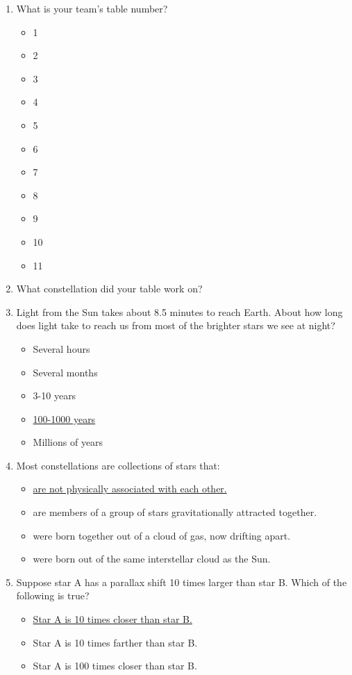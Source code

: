 \documentclass[12pt]{article}
\begin{document}
\begin{enumerate}
\item
What is your team's table number?
\begin{itemize}
    \item 1
    \item 2
    \item 3
    \item 4
    \item 5
    \item 6
    \item 7
    \item 8
    \item 9
    \item 10
    \item 11
\end{itemize}
\item
What constellation did your table work on?
\item
Light from the Sun takes about 8.5 minutes to reach Earth. About how long does light take to reach us from most of the brighter stars we see at night?
\begin{itemize}
    \item Several hours
    \item Several months
    \item 3-10 years
    \item \underline{100-1000 years}
    \item Millions of years
\end{itemize}
\item
Most constellations are collections of stars that:
\begin{itemize}
    \item \underline{are not physically associated with each other.}
    \item are members of a group of stars gravitationally attracted together.
    \item were born together out of a cloud of gas, now drifting apart.
    \item were born out of the same interstellar cloud as the Sun.
\end{itemize}
\item
Suppose star A has a parallax shift 10 times larger than star B. Which of the following is true?
\begin{itemize}
    \item \underline{Star A is 10 times closer than star B.}
    \item Star A is 10 times farther than star B.
    \item Star A is 100 times closer than star B.

\end{itemize}
\end{enumerate}
\end{document}
